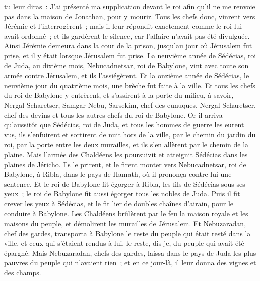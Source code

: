 \begin{multicols}{2}
tu leur diras~: J'ai présenté ma supplication devant le roi afin qu'il ne me renvoie pas dans la maison de Jonathan, pour y mourir.
Tous les chefs donc, vinrent vers Jérémie et l'interrogèrent~; mais il leur répondit exactement comme le roi lui avait ordonné~; et ils gardèrent le silence, car l'affaire n'avait pas été divulguée.
Ainsi Jérémie demeura dans la cour de la prison, jusqu'au jour où Jérusalem fut prise, et il y était lorsque Jérusalem fut prise.
\VerseOne{}La neuvième année de Sédécias, roi de Juda, au dixième mois, Nebucadnetsar, roi de Babylone, vint avec toute son armée contre Jérusalem, et ils l'assiégèrent.
Et la onzième année de Sédécias, le neuvième jour du quatrième mois, une brèche fut faite à la ville.
Et tous les chefs du roi de Babylone y entrèrent, et s'assirent à la porte du milieu, à savoir, Nergal-Scharetser, Samgar-Nebu, Sarsekim, chef des eunuques, Nergal-Scharetser, chef des devins et tous les autres chefs du roi de Babylone.
Or il arriva qu'aussitôt que Sédécias, roi de Juda, et tous les hommes de guerre les eurent vus, ils s'enfuirent et sortirent de nuit hors de la ville, par le chemin du jardin du roi, par la porte entre les deux murailles, et ils s'en allèrent par le chemin de la plaine.
Mais l'armée des Chaldéens les poursuivit et atteignit Sédécias dans les plaines de Jéricho. Ils le prirent, et le firent monter vers Nebucadnetsar, roi de Babylone, à Ribla, dans le pays de Hamath, où il prononça contre lui une sentence.
Et le roi de Babylone fit égorger à Ribla, les fils de Sédécias sous ses yeux~; le roi de Babylone fit aussi égorger tous les nobles de Juda.
Puis il fit crever les yeux à Sédécias, et le fit lier de doubles chaînes d'airain, pour le conduire à Babylone.
Les Chaldéens brûlèrent par le feu la maison royale et les maisons du peuple, et démolirent les murailles de Jérusalem.
Et Nebuzaradan, chef des gardes, transporta à Babylone le reste du peuple qui était resté dans la ville, et ceux qui s'étaient rendus à lui, le reste, dis-je, du peuple qui avait été épargné.
Mais Nebuzaradan, chefs des gardes, laissa dans le pays de Juda les plus pauvres du peuple qui n'avaient rien~; et en ce jour-là, il leur donna des vignes et des champs.

\end{multicols}
